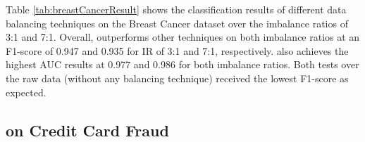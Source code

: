 %	
	
%	
%





Table \ref{tab:breastCancerResult} shows the classification results of different data balancing techniques on the Breast Cancer dataset over the imbalance ratios of 3:1 and 7:1. Overall, \Methodname{} outperforms other techniques on both imbalance ratios at an F1-score of 0.947 and 0.935 for IR of 3:1 and 7:1, respectively. \Methodname{} also achieves the highest AUC results at 0.977 and 0.986 for both imbalance ratios. Both tests over the raw data (without any balancing technique) received the lowest F1-score as expected. 


%



\subsection{\Methodname{} on Credit Card Fraud}


